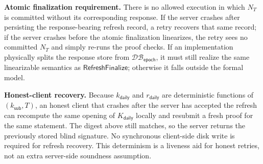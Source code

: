 \documentclass[11pt]{article}
\theoremstyle{definitionstyle}
\theoremstyle{plain}
\newcommand{\DB}{\mathcal{DB}}
\begin{document}
\textbf{Atomic finalization requirement.}
There is no allowed execution in which $N_T$ is committed without its corresponding response. If the server crashes after persisting the response-bearing refresh record, a retry recovers that same record; if the server crashes before the atomic finalization linearizes, the retry sees no committed $N_T$ and simply re-runs the proof checks. If an implementation physically splits the response store from $\DB_{\mathsf{epoch}}$, it must still realize the same linearizable semantics as $\mathsf{RefreshFinalize}$; otherwise it falls outside the formal model.

\textbf{Honest-client recovery.}
Because $k_{\mathsf{daily}}$ and $r_{\mathsf{daily}}$ are deterministic functions of $(k_{\mathsf{sub}},T)$, an honest client that crashes after the server has accepted the refresh can recompute the same opening of $K_{\mathsf{daily}}$ locally and resubmit a fresh proof for the same statement. The digest above still matches, so the server returns the previously stored blind signature. No synchronous client-side disk write is required for refresh recovery. This determinism is a liveness aid for honest retries, not an extra server-side soundness assumption.
\end{document}
